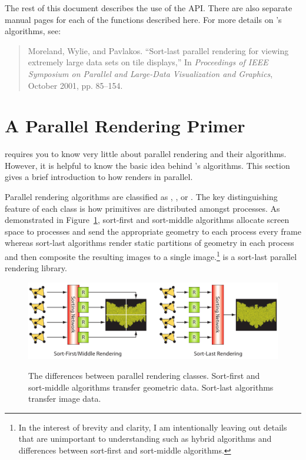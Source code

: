 The rest of this document describes the use of the
\IceT
API.  There are also separate manual pages for each of the functions
described here.  For more details on
\IceT's
algorithms, see:

\begin{quote}
  Moreland, Wylie, and Pavlakos.  ``Sort-last parallel rendering for
  viewing extremely large data sets on tile displays,'' In
  \emph{Proceedings of IEEE Symposium on Parallel and Large-Data
    Visualization and Graphics}, October 2001, pp. 85--154.
\end{quote}


\section{A Parallel Rendering Primer}
\label{sec:Introduction:Parallel_Rendering_Primer}

\IceT requires you to know very little about parallel rendering and their
algorithms.  However, it is helpful to know the basic idea behind \IceT's
algorithms.  This section gives a brief introduction to how \IceT renders
in parallel.

Parallel rendering algorithms are classified as
,
, or
.  The key distinguishing feature of
each class is how primitives are distributed amongst processes.  As
demonstrated in Figure~\ref{fig:Introduction:ParallelRenderingClasses},
sort-first and sort-middle algorithms allocate screen space to processes
and send the appropriate geometry to each process every frame whereas
sort-last algorithms render static partitions of geometry in each process
and then composite the resulting images to a single image.\footnote{In the
  interest of brevity and clarity, I am intentionally leaving out details
  that are unimportant to understanding \IceT such as hybrid algorithms and
  differences between sort-first and sort-middle algorithms.}  \IceT is a
sort-last parallel rendering library.

\begin{figure}
  \includegraphics{images/ParallelRenderingClasses}
  \label{fig:Introduction:ParallelRenderingClasses}
  \caption{The differences between parallel rendering classes.  Sort-first
    and sort-middle algorithms transfer geometric data.  Sort-last
    algorithms transfer image data.}
\end{figure}

